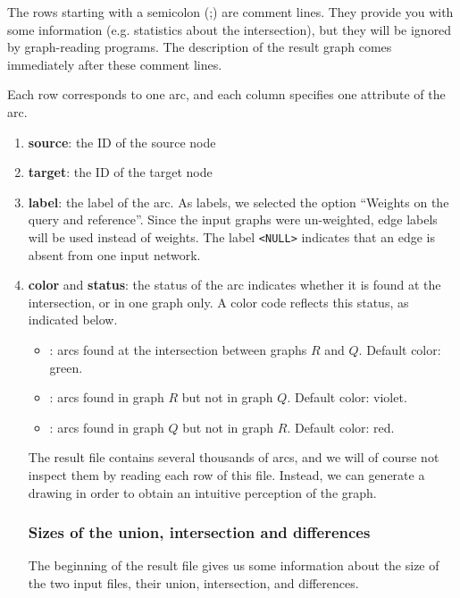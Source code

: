 The rows starting with a semicolon (;) are comment lines. They provide
you with some information (e.g. statistics about the intersection),
but they will be ignored by graph-reading programs. The description of
the result graph comes immediately after these comment lines.

Each row corresponds to one arc, and each column specifies one
attribute of the arc.

\begin{enumerate}
\item \textbf{source}: the ID of the source node
  
\item \textbf{target}: the ID of the target node
  
\item \textbf{label}: the label of the arc. As labels, we selected
  the option ``Weights on the query and reference''. Since the
  input graphs were un-weighted, edge labels will be used instead
  of weights. The label \texttt{<NULL>} indicates that an edge is
  absent from one input network.
  
\item \textbf{color} and \textbf{status}: the status of the arc
  indicates whether it is found at the intersection, or in one graph
  only.  A color code reflects this status, as indicated below.
  \begin{itemize}
  \item {}: arcs found at the intersection between graphs $R$
    and $Q$. Default color: green.
  \item {}: arcs found in graph $R$ but not in graph
    $Q$. Default color: violet.
  \item {}: arcs found in graph $Q$ but not in graph
    $R$. Default color: red.
  \end{itemize}

  The result file contains several thousands of arcs, and we will of
  course not inspect them by reading each row of this file. Instead,
  we can generate a drawing in order to obtain an intuitive perception
  of the graph.

\subsubsection{Sizes of the union, intersection and differences}

The beginning of the result file gives us some information about the
size of the two input files, their union, intersection, and
differences.


\end{enumerate}
